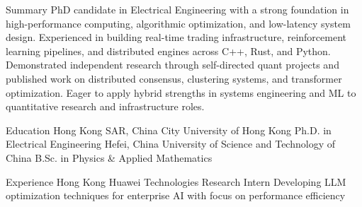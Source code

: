\documentclass[caps, english]{financecv}
\begin{document}
\begin{cvsection}{Summary}
PhD candidate in Electrical Engineering with a strong foundation in high-performance computing, algorithmic optimization, and low-latency system design. Experienced in building real-time trading infrastructure, reinforcement learning pipelines, and distributed engines across C++, Rust, and Python. Demonstrated independent research through self-directed quant projects and published work on distributed consensus, clustering systems, and transformer optimization. Eager to apply hybrid strengths in systems engineering and ML to quantitative research and infrastructure roles.
\end{cvsection}

\begin{cvsection}{Education}
{Hong Kong SAR, China}
{City University of Hong Kong}
{Ph.D. in Electrical Engineering}
{}
{}
{}
{}
{Hefei, China}
{University of Science and Technology of China}
{B.Sc. in Physics \& Applied Mathematics}
{}
{}
{}
{}
\end{cvsection}

\begin{cvsection}{Experience}
{Hong Kong}
{Huawei Technologies}
{Research Intern}
{Developing LLM optimization techniques for enterprise AI with focus on performance efficiency}
{}
{}
{}
\end{cvsection}
\end{document}
